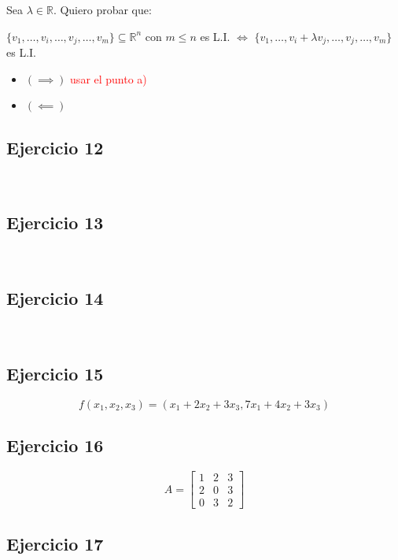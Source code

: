 \documentclass{article}
\begin{document}
Sea $\lambda \in \mathbb{R}$. Quiero probar que:

\begin{center}
    $\{v_1,\ldots,v_i,\ldots,v_j,\ldots,v_m\} \subseteq \mathbb{R}^{n}$ con $m \leq n$ es L.I. 
    $\iff$ 
    $\{v_1,\ldots,v_i + \lambda v_j,\ldots,v_j,\ldots,v_m\}$ es L.I.
\end{center}

\begin{itemize}
    \item[] $(\implies)$ \textcolor{red}{usar el punto a)} 
    \item[] $(\impliedby)$ 
\end{itemize}

\subsection*{Ejercicio 12}

\

\subsection*{Ejercicio 13}

\

\subsection*{Ejercicio 14}

\

\subsection*{Ejercicio 15}

\[f(x_1,x_2,x_3) = (x_1 + 2x_2 + 3x_3, 7x_1 + 4x_2 + 3x_3)\]

\subsection*{Ejercicio 16}

\[A = \begin{bmatrix}
    1 & 2 & 3 \\
    2 & 0 & 3 \\
    0 & 3 & 2
\end{bmatrix}\]

\subsection*{Ejercicio 17}
\end{document}
